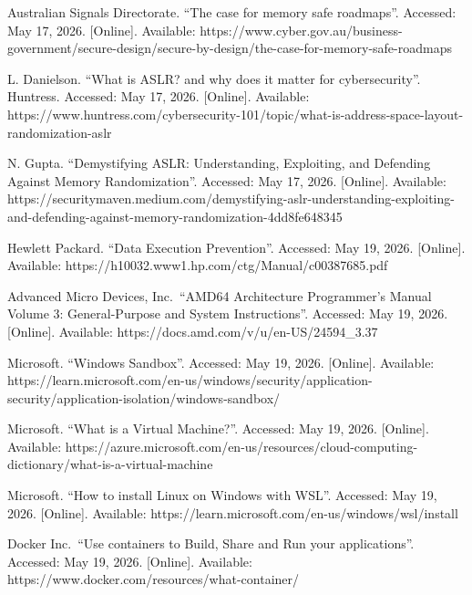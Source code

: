 Australian Signals Directorate. ``The case for memory safe roadmaps''.
Accessed: May 17, 2026. {[}Online{]}. Available:
https://www.cyber.gov.au/business-government/secure-design/secure-by-design/the-case-for-memory-safe-roadmaps

L. Danielson. ``What is ASLR? and why does it matter for
cybersecurity''. Huntress. Accessed: May 17, 2026. {[}Online{]}.
Available:
https://www.huntress.com/cybersecurity-101/topic/what-is-address-space-layout-randomization-aslr

N. Gupta. ``Demystifying ASLR: Understanding, Exploiting, and Defending
Against Memory Randomization''. Accessed: May 17, 2026. {[}Online{]}.
Available:
https://securitymaven.medium.com/demystifying-aslr-understanding-exploiting-and-defending-against-memory-randomization-4dd8fe648345

Hewlett Packard. ``Data Execution Prevention''. Accessed: May 19, 2026.
{[}Online{]}. Available:
https://h10032.www1.hp.com/ctg/Manual/c00387685.pdf

Advanced Micro Devices, Inc.~``AMD64 Architecture Programmer's Manual
Volume 3: General-Purpose and System Instructions''. Accessed: May 19,
2026. {[}Online{]}. Available:
https://docs.amd.com/v/u/en-US/24594\_3.37

Microsoft. ``Windows Sandbox''. Accessed: May 19, 2026. {[}Online{]}.
Available:
https://learn.microsoft.com/en-us/windows/security/application-security/application-isolation/windows-sandbox/

Microsoft. ``What is a Virtual Machine?''. Accessed: May 19, 2026.
{[}Online{]}. Available:
https://azure.microsoft.com/en-us/resources/cloud-computing-dictionary/what-is-a-virtual-machine

Microsoft. ``How to install Linux on Windows with WSL''. Accessed: May
19, 2026. {[}Online{]}. Available:
https://learn.microsoft.com/en-us/windows/wsl/install

Docker Inc.~``Use containers to Build, Share and Run your
applications''. Accessed: May 19, 2026. {[}Online{]}. Available:
https://www.docker.com/resources/what-container/
